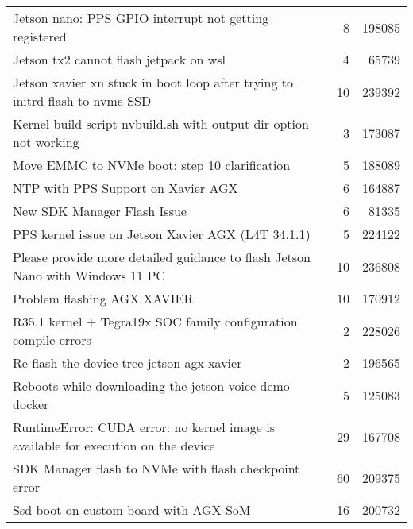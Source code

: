 \begin{longtable}{p{}rr}
    Jetson nano: PPS GPIO interrupt not getting registered                                              & 8        & 198085 \\
    Jetson tx2 cannot flash jetpack on wsl                                                              & 4        & 65739  \\
    Jetson xavier xn stuck in boot loop after trying to initrd flash to nvme SSD                        & 10       & 239392 \\
    Kernel build script nvbuild.sh with output dir option not working                                   & 3        & 173087 \\
    Move EMMC to NVMe boot: step 10 clarification                                                       & 5        & 188089 \\
    NTP with PPS Support on Xavier AGX                                                                  & 6        & 164887 \\
    New SDK Manager Flash Issue                                                                         & 6        & 81335  \\
    PPS kernel issue on Jetson Xavier AGX (L4T 34.1.1)                                                  & 5        & 224122 \\
    Please provide more detailed guidance to flash Jetson Nano with Windows 11 PC                       & 10       & 236808 \\
    Problem flashing AGX XAVIER                                                                         & 10       & 170912 \\
    R35.1 kernel + Tegra19x SOC family configuration compile errors                                     & 2        & 228026 \\
    Re-flash the device tree jetson agx xavier                                                          & 2        & 196565 \\
    Reboots while downloading the jetson-voice demo docker                                              & 5        & 125083 \\
    RuntimeError: CUDA error: no kernel image is available for execution on the device                  & 29       & 167708 \\
    SDK Manager flash to NVMe with flash checkpoint error                                               & 60       & 209375 \\
    Ssd boot on custom board with AGX SoM                                                               & 16       & 200732 \\

\end{longtable}
